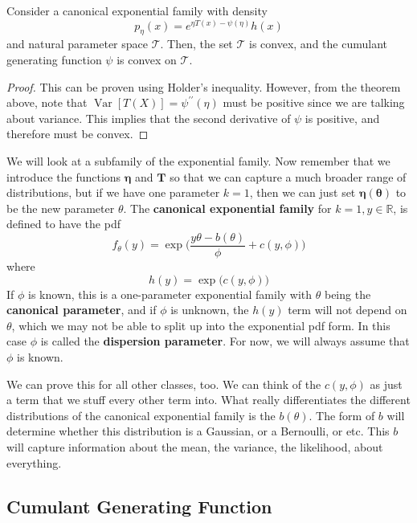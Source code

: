 \documentclass{article}
\DeclareMathOperator{\Var}{Var}
\begin{document}
      \begin{theorem}[Convexity]
      Consider a canonical exponential family with density 
      \[p_\eta (x) = e^{\eta T(x) - \psi(\eta)} h(x)\]
      and natural parameter space $\mathcal{T}$. Then, the set $\mathcal{T}$ is convex, and the cumulant generating function $\psi$ is convex on $\mathcal{T}$. 
      \end{theorem}
      \begin{proof}
      This can be proven using Holder's inequality. However, from the theorem above, note that $\Var[T(X)] = \psi^{\prime\prime}(\eta)$ must be positive since we are talking about variance. This implies that the second derivative of $\psi$ is positive, and therefore must be convex. 
      \end{proof}

      We will look at a subfamily of the exponential family. Now remember that we introduce the functions $\boldsymbol{\eta}$ and $\mathbf{T}$ so that we can capture a much broader range of distributions, but if we have one parameter $k = 1$, then we can just set $\boldsymbol{\eta}(\boldsymbol{\theta})$ to be the new parameter $\theta$. The \textbf{canonical exponential family} for $k = 1, y \in \mathbb{R}$, is defined to have the pdf 
      \begin{equation}
        f_\theta (y) = \exp \bigg( \frac{y \theta - b(\theta)}{\phi} + c(y, \phi) \bigg)
      \end{equation}
      where 
      \begin{equation}
        h(y) = \exp \big( c(y, \phi)\big)
      \end{equation}
      If $\phi$ is known, this is a one-parameter exponential family with $\theta$ being the \textbf{canonical parameter}, and if $\phi$ is unknown, the $h(y)$ term will not depend on $\theta$, which we may not be able to split up into the exponential pdf form. In this case $\phi$ is called the \textbf{dispersion parameter}. For now, we will always assume that $\phi$ is known. 

      We can prove this for all other classes, too. We can think of the $c(y, \phi)$ as just a term that we stuff every other term into. What really differentiates the different distributions of the canonical exponential family is the $b(\theta)$. The form of $b$ will determine whether this distribution is a Gaussian, or a Bernoulli, or etc. This $b$ will capture information about the mean, the variance, the likelihood, about everything. 

      \subsection{Cumulant Generating Function}
\end{document}
